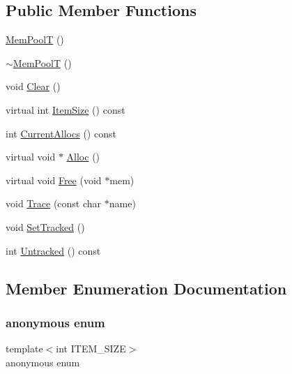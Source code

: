 \subsection*{Public Member Functions}
\begin{DoxyCompactItemize}
\item 
\mbox{\hyperlink{classtinyxml2_1_1_mem_pool_t_ac8fa6dbb403f009cf9c8a33c6f2803b3}{Mem\+PoolT}} ()
\item 
\mbox{\hyperlink{classtinyxml2_1_1_mem_pool_t_a5fa4fee934a3df2b9e74282244d78390}{$\sim$\+Mem\+PoolT}} ()
\item 
void \mbox{\hyperlink{classtinyxml2_1_1_mem_pool_t_a22d595caa0e9d23aa080f49ca6475fdd}{Clear}} ()
\item 
virtual int \mbox{\hyperlink{classtinyxml2_1_1_mem_pool_t_a54e4d9b343459ef1731314a99877ff35}{Item\+Size}} () const
\item 
int \mbox{\hyperlink{classtinyxml2_1_1_mem_pool_t_a445a6c80151ba6268b24ec62a7c84d74}{Current\+Allocs}} () const
\item 
virtual void $\ast$ \mbox{\hyperlink{classtinyxml2_1_1_mem_pool_t_a810fd2b0caf56b8b688e55f2768f96c7}{Alloc}} ()
\item 
virtual void \mbox{\hyperlink{classtinyxml2_1_1_mem_pool_t_a408ce0918e9d3d5e5e1cc4896944875f}{Free}} (void $\ast$mem)
\item 
void \mbox{\hyperlink{classtinyxml2_1_1_mem_pool_t_a47eefbd934ef70d973ea41d41ab5f239}{Trace}} (const char $\ast$name)
\item 
void \mbox{\hyperlink{classtinyxml2_1_1_mem_pool_t_aee3c611215ae08cce41a940bf2763027}{Set\+Tracked}} ()
\item 
int \mbox{\hyperlink{classtinyxml2_1_1_mem_pool_t_a3bcdc302ae15d2810e11192321a8f5f1}{Untracked}} () const
\end{DoxyCompactItemize}


\subsection{Member Enumeration Documentation}
\mbox{\label{classtinyxml2_1_1_mem_pool_t_a04cf45156e6f913f93972869ff8a1d94}} 
\subsubsection{\texorpdfstring{anonymous enum}{anonymous enum}}
{\footnotesize\ttfamily template$<$int I\+T\+E\+M\+\_\+\+S\+I\+ZE$>$ \\
anonymous enum}

